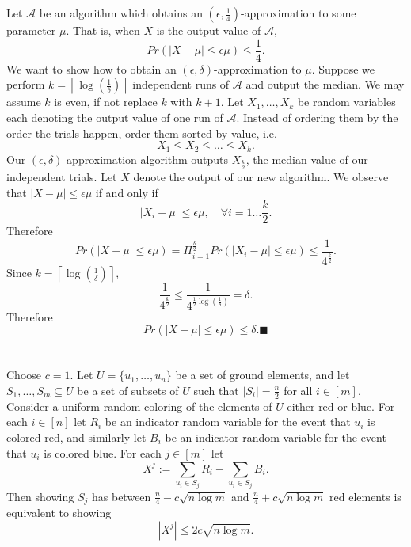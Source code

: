\documentclass[letterpaper,12pt,oneside,onecolumn]{article}
\newcommand{\cA}{\mathcal{A}} \newcommand{\cB}{\mathcal{B}}
\newcommand{\ceil}[1]{\ensuremath{\left\lceil#1\right\rceil}}
\begin{document}
\section{}
\paragraph{}
Let $\cA$ be an algorithm which obtains an $(\epsilon, \frac{1}{4})$-approximation to some parameter $\mu$. That is, when $X$ is the output value of $\cA$,
$$Pr(|X - \mu| \leq \epsilon\mu) \leq \frac{1}{4}.$$
We want to show how to obtain an $(\epsilon,\delta)$-approximation to $\mu$. Suppose we perform $k = \ceil{\log(\frac{1}{\delta})}$ independent runs of $\cA$ and output the median. We may assume $k$ is even, if not replace $k$ with $k+1$. Let $X_1, \dots, X_k$ be random variables each denoting the output value of one run of $\cA$. Instead of ordering them by the order the trials happen, order them sorted by value, i.e.
$$X_1 \leq X_2 \leq \dots\leq X_k.$$
Our $(\epsilon,\delta)$-approximation algorithm outputs $X_\frac{k}{2}$, the median value of our independent trials. Let $X$ denote the output of our new algorithm. We observe that $|X - \mu|\leq \epsilon \mu$ if and only if 
$$|X_i - \mu | \leq \epsilon \mu, \quad \forall i=1 \dots \frac{k}{2}.$$
Therefore
$$Pr(|X-\mu| \leq \epsilon \mu) = \Pi_{i=1}^\frac{k}{2} Pr(|X_i - \mu| \leq \epsilon \mu) \leq \frac{1}{4^\frac{k}{2}}.$$
Since $k = \ceil{\log(\frac{1}{\delta})}$,
$$\frac{1}{4^\frac{k}{2}} \leq \frac{1}{4^{\frac{1}{2}\log(\frac{1}{\delta})}} = \delta.$$
Therefore
$$Pr(|X-\mu| \leq \epsilon \mu) \leq \delta. \blacksquare$$
\newpage
\section{}
\paragraph{}
Choose $c = 1$. Let $U = \{u_1,\dots, u_n\}$ be a set of ground elements, and let $S_1, \dots, S_m \subseteq U$ be a set of subsets of $U$ such that $|S_i| = \frac{n}{2}$ for all $i\in [m]$. Consider a uniform random coloring of the elements of $U$ either red or blue. For each $i \in [n]$ let $R_i$ be an indicator random variable for the event that $u_i$ is colored red, and similarly let $B_i$ be an indicator random variable for the event that $u_i$ is colored blue. For each $j \in [m]$ let $$X^j := \sum_{u_i \in S_j} R_i - \sum_{u_i \in S_j} B_i.$$
Then showing $S_j$ has between $\frac{n}{4} - c\sqrt{n\log m}$ and $\frac{n}{4} +c\sqrt{n\log m}$ red elements is equivalent to showing $$|X^j| \leq 2c\sqrt{n\log m}.$$
\end{document}
